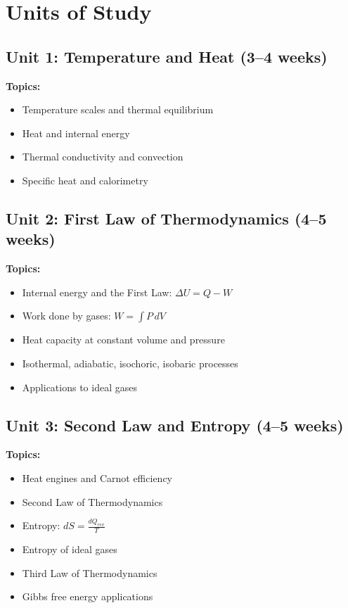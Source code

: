 \documentclass[12pt,oneside]{book}
\begin{document}
\section{Units of Study}

\subsection{Unit 1: Temperature and Heat (3--4 weeks)}

\textbf{Topics:}
\begin{itemize}
    \item Temperature scales and thermal equilibrium
    \item Heat and internal energy
    \item Thermal conductivity and convection
    \item Specific heat and calorimetry
\end{itemize}

\subsection{Unit 2: First Law of Thermodynamics (4--5 weeks)}

\textbf{Topics:}
\begin{itemize}
    \item Internal energy and the First Law: $\Delta U = Q - W$
    \item Work done by gases: $W = \int P \, dV$
    \item Heat capacity at constant volume and pressure
    \item Isothermal, adiabatic, isochoric, isobaric processes
    \item Applications to ideal gases
\end{itemize}

\subsection{Unit 3: Second Law and Entropy (4--5 weeks)}

\textbf{Topics:}
\begin{itemize}
    \item Heat engines and Carnot efficiency
    \item Second Law of Thermodynamics
    \item Entropy: $dS = \frac{dQ_{rev}}{T}$
    \item Entropy of ideal gases
    \item Third Law of Thermodynamics
    \item Gibbs free energy applications
\end{itemize}
\end{document}
